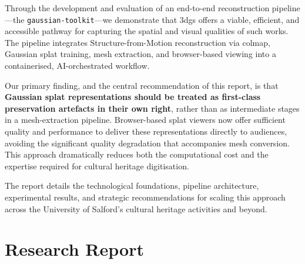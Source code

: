 \documentclass[a4paper,11pt,twoside,openright]{report}
\begin{document}
Through the development and evaluation of an end-to-end reconstruction pipeline---the \texttt{gaussian-toolkit}---we demonstrate that \acrshort{3dgs} offers a viable, efficient, and accessible pathway for capturing the spatial and visual qualities of such works. The pipeline integrates Structure-from-Motion reconstruction via \acrshort{colmap}, Gaussian splat training, mesh extraction, and browser-based viewing into a containerised, AI-orchestrated workflow.

Our primary finding, and the central recommendation of this report, is that \textbf{Gaussian splat representations should be treated as first-class preservation artefacts in their own right}, rather than as intermediate stages in a mesh-extraction pipeline. Browser-based splat viewers now offer sufficient quality and performance to deliver these representations directly to audiences, avoiding the significant quality degradation that accompanies mesh conversion. This approach dramatically reduces both the computational cost and the expertise required for cultural heritage digitisation.

The report details the technological foundations, pipeline architecture, experimental results, and strategic recommendations for scaling this approach across the University of Salford's cultural heritage activities and beyond.

\tableofcontents
\listoffigures
\listoftables

\printglossary[type=\acronymtype, title={Acronyms and Abbreviations}]

\cleardoublepage
{}

\part{Research Report}
\label{part:research}










\cleardoublepage
\end{document}
